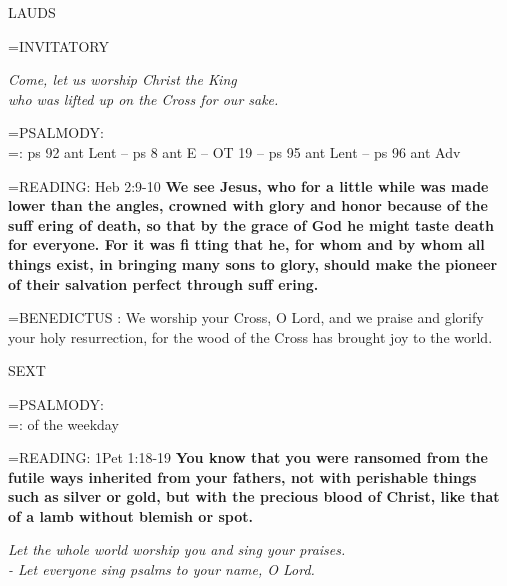 \begin{flushleft}\normalsize LAUDS\\\end{flushleft}

\hangindent=\parindent \small{INVITATORY}
\begin{center}
\textit{Come, let us worship Christ the King\\}
\textit{who was lifted up on the Cross for our sake.\\}
\end{center}

\hangindent=\parindent \small{PSALMODY:}\\
\hangindent=\parindent : ps 92 ant Lent -- ps 8 ant E -- OT 19 -- ps 95 ant Lent -- ps 96 ant Adv\vspace{0.5em}

\hangindent=\parindent \small{READING}: Heb 2:9-10 \textbf{We see Jesus, who for a little while was made
lower than the angles, crowned with glory and honor because of
the suff ering of death, so that by the grace of God he might taste
death for everyone. For it was fi tting that he, for whom and by
whom all things exist, in bringing many sons to glory, should make
the pioneer of their salvation perfect through suff ering.\\}
 
\hangindent=\parindent \small{BENEDICTUS : We worship your Cross, O Lord, and we praise and
glorify your holy resurrection, for the wood of the Cross has brought
joy to the world.\\}
 
\begin{flushleft}\normalsize SEXT\\\end{flushleft}

\hangindent=\parindent \small{PSALMODY:}\\
\hangindent=\parindent : of the weekday\vspace{0.5em}

\hangindent=\parindent \small{READING}: 1Pet 1:18-19 \textbf{You know that you were ransomed from the
futile ways inherited from your fathers, not with perishable things
such as silver or gold, but with the precious blood of Christ, like
that of a lamb without blemish or spot.}
 
\begin{center}
\textit{Let the whole world worship you and sing your praises.\\
- Let everyone sing psalms to your name, O Lord.}
\end{center}

